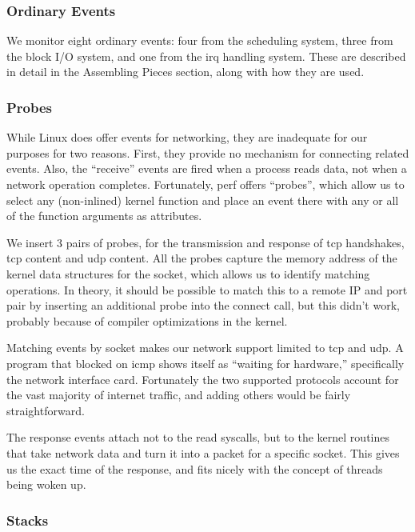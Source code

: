 \documentclass[10pt]{article}
\begin{document}
\subsubsection{Ordinary Events}

We monitor eight ordinary events: four from the sched\-uling system, three from the block I/O system, and one from the irq handling system.  These are described in detail in the Assembling Pieces section, along with how they are used.

\subsubsection{Probes}

While Linux does offer events for networking, they are inadequate for our purposes for two reasons.  First, they provide no mechanism for connecting related events.  Also, the ``receive'' events are fired when a process reads data, not when a network operation completes.  Fortunately, perf offers ``probes'', which allow us to select any (non-inlined) kernel function and place an event there with any or all of the function arguments as attributes.

We insert 3 pairs of probes, for the transmission and response of tcp handshakes, tcp content and udp content.  All the probes capture the memory address of the kernel data structures for the socket, which allows us to identify matching operations.  In theory, it should be possible to match this to a remote IP and port pair by inserting an additional probe into the connect call, but this didn't work, probably because of compiler optimizations in the kernel.  

Matching events by socket makes our network support limited to tcp and udp.  A program that blocked on icmp shows itself as ``waiting for hardware,'' specifically the network interface card.  Fortunately the two supported protocols account for the vast majority of internet traffic, and adding others would be fairly straightforward.

The response events attach not to the read syscalls, but to the kernel routines that take network data and turn it into a packet for a specific socket.  This gives us the exact time of the response, and fits nicely with the concept of threads being woken up.

\subsubsection{Stacks}
\end{document}
